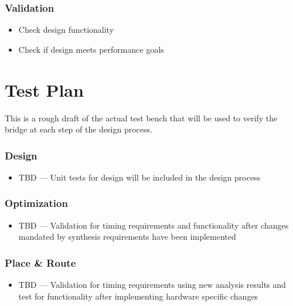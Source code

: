\documentclass[a4paper]{report}   %
\begin{document}
\subsection{Validation}
\begin{itemize}
  \item{Check design functionality}
  \item{Check if design meets performance goals}
\end{itemize}

\chapter{Test Plan}
This is a rough draft of the actual test bench that will be used to verify the bridge at each step of the design process.
\linebreak

\subsection{Design}
\begin{itemize}
  \item{TBD --- Unit tests for design will be included in the design process}
\end{itemize}

\subsection{Optimization}
\begin{itemize}
    \item{TBD --- Validation for timing requirements and functionality after changes mandated by synthesis requirements have been implemented}
\end{itemize}
\subsection{Place \& Route}
\begin{itemize}
  \item{TBD --- Validation for timing requirements using new analysis results and test for functionality after implementing hardware specific changes}
\end{itemize}
\end{document}
